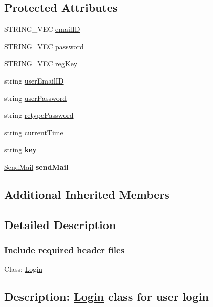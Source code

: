 \subsection*{Protected Attributes}
\begin{DoxyCompactItemize}
\item 
S\-T\-R\-I\-N\-G\-\_\-\-V\-E\-C \hyperlink{classLogin_abea56d6d6403f1e627294f222dd77310}{email\-I\-D}
\item 
S\-T\-R\-I\-N\-G\-\_\-\-V\-E\-C \hyperlink{classLogin_a39f7fd03b2b27c927c657ee73e7fcbbc}{password}
\item 
S\-T\-R\-I\-N\-G\-\_\-\-V\-E\-C \hyperlink{classLogin_ae22f0ed73e5248cd71a7b2167676376a}{reg\-Key}
\item 
string \hyperlink{classLogin_aa83b4706e0f0f0afc65f210ee8e4839a}{user\-Email\-I\-D}
\item 
string \hyperlink{classLogin_a9731be126468f535f161f045c95687c6}{user\-Password}
\item 
string \hyperlink{classLogin_ade36f8943aafce470ef4b8353c79b2c6}{retype\-Password}
\item 
string \hyperlink{classLogin_a624f15ecf989648b73a91743f67a6880}{current\-Time}
\item 
\hypertarget{classLogin_ab7769b44690490b43fc9046ad5958baf}{string {\bfseries key}}\label{classLogin_ab7769b44690490b43fc9046ad5958baf}

\item 
\hypertarget{classLogin_a36ff1dd294aaaf884805325cee3b83d3}{\hyperlink{classSendMail}{Send\-Mail} {\bfseries send\-Mail}}\label{classLogin_a36ff1dd294aaaf884805325cee3b83d3}

\end{DoxyCompactItemize}
\subsection*{Additional Inherited Members}


\subsection{Detailed Description}


 \subsubsection*{Include required header files}



 Class\-: \hyperlink{classLogin}{Login} \subsection*{Description\-: \hyperlink{classLogin}{Login} class for user login}

